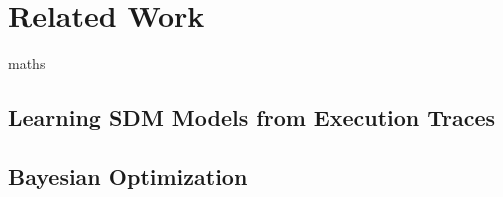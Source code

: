 \chapter{Related Work}
\label{ch:related-work}
\gls{maths}

\section{Learning SDM Models from Execution Traces}
\label{sec:learning-models}



\section{Bayesian Optimization}
\label{sec:bayesian-optimization}



%
%
